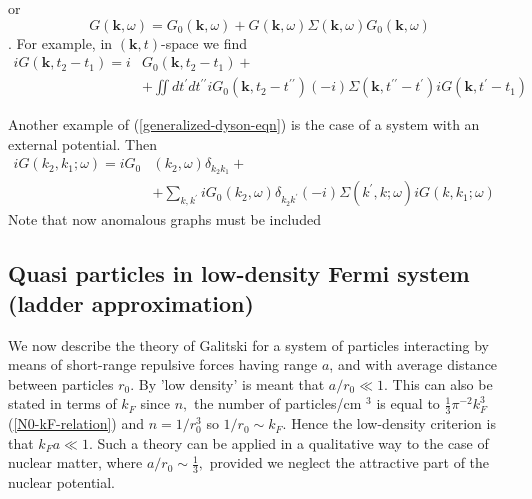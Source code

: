 or
\begin{equation}G(\mathbf{k}, \omega)=G_{0}(\mathbf{k}, \omega)+G(\mathbf{k}, \omega) \Sigma(\mathbf{k}, \omega) G_{0}(\mathbf{k}, \omega)\end{equation}
. For example, in $(\mathbf{k},t)$-space we find
\begin{equation}\begin{aligned}
i G\left(\mathbf{k}, t_{2}-t_{1}\right)=i &G_{0}\left(\mathbf{k}, t_{2}-t_{1}\right)+\\
&+\iint d t^{\prime} d t^{\prime \prime} i G_{0}\left(\mathbf{k}, t_{2}-t^{\prime \prime}\right)(-i) \Sigma\left(\mathbf{k}, t^{\prime \prime}-t^{\prime}\right) i G\left(\mathbf{k}, t^{\prime}-t_{1}\right)
\end{aligned}\end{equation}

Another example of (\ref{generalized-dyson-eqn}) is the case of a system with an external potential. Then
\begin{equation}\begin{aligned}
i G\left(k_{2}, k_{1} ; \omega\right)=i G_{0}&\left(k_{2}, \omega\right) \delta_{k_{2} k_{1}}+& \\
&+\sum_{k, k^{\prime}} i G_{0}\left(k_{2}, \omega\right) \delta_{k_{2} k^{\prime}}(-i) \Sigma\left(k^{\prime}, k ; \omega\right) i G\left(k, k_{1} ; \omega\right)
\end{aligned}\end{equation}
Note that now anomalous graphs must be included

\subsection{Quasi particles in low-density Fermi system (ladder approximation)}
We now describe the theory of Galitski for a system of particles interacting by means of short-range repulsive forces having range $a$, and with average distance between particles $r_0$. By 'low density' is meant that $a / r_{0} \ll 1 .$ This can also be stated in terms of $k_{F}$ since $n,$ the number of particles/cm $^{3}$ is equal to $\frac{1}{3} \pi^{-2} k_{F}^{3}$(\ref{N0-kF-relation}) and $n=1 / r_{0}^{3}$ so $1 / r_{0} \sim k_{F} .$ Hence the low-density criterion is that $k_{F} a \ll 1 .$ Such a theory can be applied in a qualitative way to the case of nuclear matter, where $a / r_{0} \sim \frac{1}{3},$ provided we neglect the attractive part of the nuclear potential.